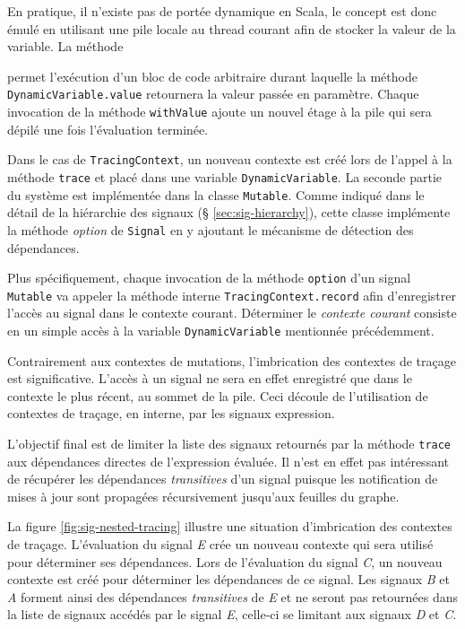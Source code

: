 En pratique, il n'existe pas de portée dynamique en Scala, le concept est donc émulé en utilisant une pile locale au thread courant afin de stocker la valeur de la variable. La méthode
\begin{center}
\end{center}
permet l'exécution d'un bloc de code arbitraire durant laquelle la méthode \texttt{DynamicVariable.value} retournera la valeur passée en paramètre. Chaque invocation de la méthode \texttt{withValue} ajoute un nouvel étage à la pile qui sera dépilé une fois l'évaluation terminée.

Dans le cas de \texttt{TracingContext}, un nouveau contexte est créé lors de l'appel à la méthode \texttt{trace} et placé dans une variable \texttt{DynamicVariable}. La seconde partie du système est implémentée dans la classe \texttt{Mutable}. Comme indiqué dans le détail de la hiérarchie des signaux (§ \ref{sec:sig-hierarchy}), cette classe implémente la méthode \emph{option} de \texttt{Signal} en y ajoutant le mécanisme de détection des dépendances.

Plus spécifiquement, chaque invocation de la méthode \texttt{option} d'un signal \texttt{Mutable} va appeler la méthode interne \texttt{TracingContext.record} afin d'enregistrer l'accès au signal dans le contexte courant. Déterminer le \emph{contexte courant} consiste en un simple accès à la variable \texttt{DynamicVariable} mentionnée précédemment.

Contrairement aux contextes de mutations, l'imbrication des contextes de traçage est significative. L'accès à un signal ne sera en effet enregistré que dans le contexte le plus récent, au sommet de la pile. Ceci découle de l'utilisation de contextes de traçage, en interne, par les signaux expression. 

L'objectif final est de limiter la liste des signaux retournés par la méthode \texttt{trace} aux dépendances directes de l'expression évaluée. Il n'est en effet pas intéressant de récupérer les dépendances \emph{transitives} d'un signal puisque les notification de mises à jour sont propagées récursivement jusqu'aux feuilles du graphe.

La figure \ref{fig:sig-nested-tracing} illustre une situation d'imbrication des contextes de traçage. L'évaluation du signal \emph{E} crée un nouveau contexte qui sera utilisé pour déterminer ses dépendances. Lors de l'évaluation du signal \emph{C}, un nouveau contexte est créé pour déterminer les dépendances de ce signal. Les signaux \emph{B} et \emph{A} forment ainsi des dépendances \emph{transitives} de \emph{E} et ne seront pas retournées dans la liste de signaux accédés par le signal \emph{E}, celle-ci se limitant aux signaux \emph{D} et \emph{C}.

